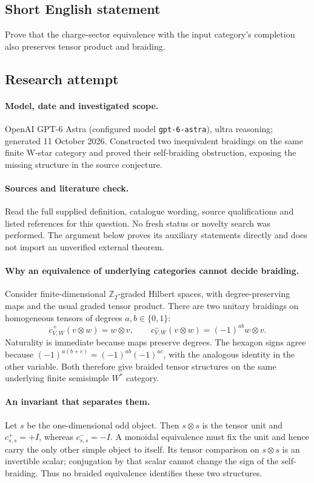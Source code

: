 \documentclass[11pt]{article}
\begin{document}
\subsection{Short English statement}
Prove that the charge-sector equivalence with the input category's completion also preserves tensor product and braiding.
\subsection{Research attempt}
\paragraph{Model, date and investigated scope.}
OpenAI GPT-6 Astra (configured model \texttt{gpt-6-astra}), ultra reasoning; generated 11 October 2026. Constructed two inequivalent braidings on the same finite W-star category and proved their self-braiding obstruction, exposing the missing structure in the source conjecture.

\paragraph{Sources and literature check.}
Read the full supplied definition, catalogue wording, source qualifications and listed references for this question. No fresh status or novelty search was performed. The argument below proves its auxiliary statements directly and does not import an unverified external theorem.

\paragraph{Why an equivalence of underlying categories cannot decide braiding.} Consider finite-dimensional \(\mathbb Z_2\)-graded Hilbert spaces, with degree-preserving maps and the usual graded tensor product. There are two unitary braidings on homogeneous tensors of degrees \(a,b\in\{0,1\}\):
\[
 c^+_{V,W}(v\otimes w)=w\otimes v,
 \qquad c^-_{V,W}(v\otimes w)=(-1)^{ab}w\otimes v.
\]
Naturality is immediate because maps preserve degrees. The hexagon signs agree because \((-1)^{a(b+c)}=(-1)^{ab}(-1)^{ac}\), with the analogous identity in the other variable. Both therefore give braided tensor structures on the same underlying finite semisimple \(W^*\) category.
\paragraph{An invariant that separates them.} Let \(s\) be the one-dimensional odd object. Then \(s\otimes s\) is the tensor unit and \(c^+_{s,s}=+I\), whereas \(c^-_{s,s}=-I\). A monoidal equivalence must fix the unit and hence carry the only other simple object to itself. Its tensor comparison on \(s\otimes s\) is an invertible scalar; conjugation by that scalar cannot change the sign of the self-braiding. Thus no braided equivalence identifies these two structures.
\end{document}
